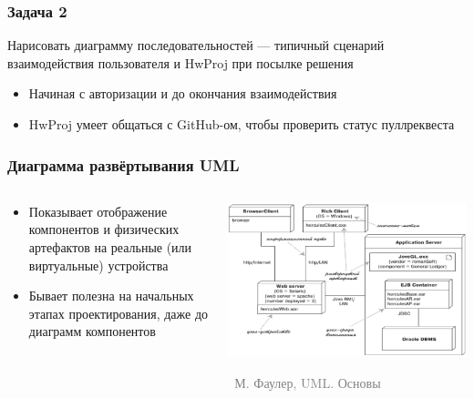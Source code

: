 \documentclass[xetex,mathserif,serif]{beamer}
\newcommand{\attribution}[1] {
	\vspace{-5mm}\begin{flushright}\begin{scriptsize}\textcolor{gray}{\textcopyright\, #1}\end{scriptsize}\end{flushright}
}
\begin{document}
	\begin{frame}
		\frametitle{Задача 2}
		Нарисовать диаграмму последовательностей --- типичный сценарий взаимодействия пользователя и HwProj при посылке решения
		\begin{itemize}
			\item Начиная с авторизации и до окончания взаимодействия
			\item HwProj умеет общаться с GitHub-ом, чтобы проверить статус пуллреквеста
		\end{itemize}
	\end{frame}

	\begin{frame}
		\frametitle{Диаграмма развёртывания UML}
		\begin{columns}
			\begin{column}{0.5\textwidth}
				\begin{itemize}
					\item Показывает отображение компонентов и физических артефактов на реальные (или виртуальные) устройства
					\item Бывает полезна на начальных этапах проектирования, даже до диаграмм компонентов
				\end{itemize}
			\end{column}
			\begin{column}{0.5\textwidth}
				\begin{center}
					\includegraphics[width=\textwidth]{deploymentDiagram.png}
					\attribution{М. Фаулер, UML. Основы}
				\end{center}
			\end{column}
		\end{columns}
	\end{frame}
\end{document}
